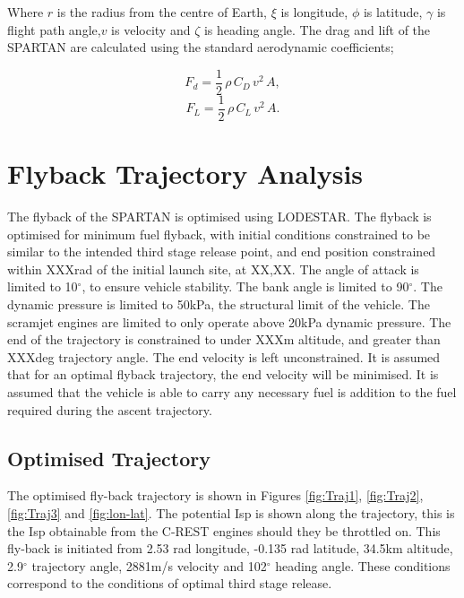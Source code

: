 \documentclass[conf]{new-aiaa}
\begin{document}
Where $r$ is the radius from the centre of Earth, $\xi$ is longitude, $\phi$ is latitude, $\gamma$ is flight path angle,$v$ is velocity and $\zeta$ is heading angle. The drag and lift of the SPARTAN are calculated using the standard aerodynamic coefficients;

\begin{equation}
F_d = \frac{1}{2} \, \rho \, C_D \, v^2 \, A ,
\end{equation}
\begin{equation}
F_L = \frac{1}{2} \, \rho \, C_L \, v^2 \, A .
\end{equation}

\section{Flyback Trajectory Analysis}
The flyback of the SPARTAN is optimised using LODESTAR. The flyback is optimised for minimum fuel flyback, with initial conditions constrained to be similar to the intended third stage release point, and end position constrained within XXXrad of the initial launch site, at XX,XX. The angle of attack is limited to 10$^\circ$, to ensure vehicle stability. The bank angle is limited to 90$^\circ$. The dynamic pressure is limited to 50kPa, the structural limit of the vehicle. The scramjet engines are limited to only operate above 20kPa dynamic pressure.
The end of the trajectory is constrained to under XXXm altitude, and greater than XXXdeg trajectory angle. The end velocity is left unconstrained. It is assumed that for an optimal flyback trajectory, the end velocity will be minimised. 
It is assumed that the vehicle is able to carry any necessary fuel is addition to the fuel required during the ascent trajectory. 

\subsection{Optimised Trajectory}

The optimised fly-back trajectory is shown in Figures \ref{fig:Traj1}, \ref{fig:Traj2}, \ref{fig:Traj3} and \ref{fig:lon-lat}. The potential Isp is shown along the trajectory, this is the Isp obtainable from the C-REST engines should they be throttled on. This fly-back is initiated from 2.53 rad longitude, -0.135 rad latitude, 34.5km altitude, 2.9$^\circ$ trajectory angle, 2881m/s velocity and 102$^\circ$ heading angle. These conditions correspond to the conditions of optimal third stage release. 
\end{document}
